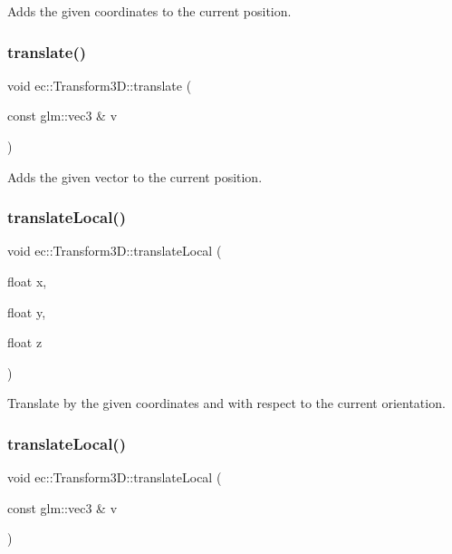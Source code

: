 Adds the given coordinates to the current position. \mbox{\label{classec_1_1_transform3_d_ae0290297c16ee5ce4f6cf2855fd26aa0}} 
\subsubsection{\texorpdfstring{translate()}{translate()}\hspace{0.1cm}{\footnotesize\ttfamily [2/2]}}
{\footnotesize\ttfamily void ec\+::\+Transform3\+D\+::translate (\begin{DoxyParamCaption}\item[{const glm\+::vec3 \&}]{v }\end{DoxyParamCaption})}

Adds the given vector to the current position. \mbox{\label{classec_1_1_transform3_d_aa32ee07603a9531e77b189185cbd40e4}} 
\subsubsection{\texorpdfstring{translate\+Local()}{translateLocal()}\hspace{0.1cm}{\footnotesize\ttfamily [1/2]}}
{\footnotesize\ttfamily void ec\+::\+Transform3\+D\+::translate\+Local (\begin{DoxyParamCaption}\item[{float}]{x,  }\item[{float}]{y,  }\item[{float}]{z }\end{DoxyParamCaption})}

Translate by the given coordinates and with respect to the current orientation. \mbox{\label{classec_1_1_transform3_d_a8769dc2eb4f1cd467d8e39c85decdd10}} 
\subsubsection{\texorpdfstring{translate\+Local()}{translateLocal()}\hspace{0.1cm}{\footnotesize\ttfamily [2/2]}}
{\footnotesize\ttfamily void ec\+::\+Transform3\+D\+::translate\+Local (\begin{DoxyParamCaption}\item[{const glm\+::vec3 \&}]{v }\end{DoxyParamCaption})}


